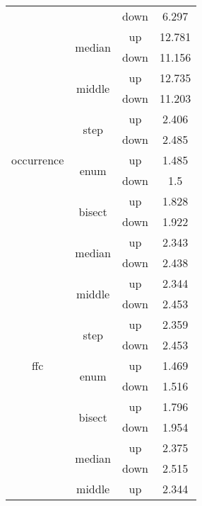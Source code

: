 \begin{table}[h!]
{\begin{tabular}{|c|c|c|c|}
                            &                         & down & 6.297 \\
                            & \multirow{2}{*}{median} & up & 12.781 \\ 
                            &                         & down & 11.156 \\
                            & \multirow{2}{*}{middle} & up & 12.735 \\ 
                            &                         & down & 11.203 \\
 \hline
\multirow{5}{*}{occurrence} & \multirow{2}{*}{step} & up & 2.406 \\ 
                            &                         & down & 2.485 \\
                            & \multirow{2}{*}{enum} & up & 1.485 \\ 
                            &                         & down & 1.5 \\
                            & \multirow{2}{*}{bisect} & up & 1.828 \\ 
                            &                         & down & 1.922 \\
                            & \multirow{2}{*}{median} & up & 2.343 \\ 
                            &                         & down & 2.438 \\
                            & \multirow{2}{*}{middle} & up & 2.344 \\ 
                            &                         & down & 2.453 \\
 \hline
\multirow{5}{*}{ffc} & \multirow{2}{*}{step} & up & 2.359 \\ 
                            &                         & down & 2.453 \\
                            & \multirow{2}{*}{enum} & up & 1.469 \\ 
                            &                         & down & 1.516 \\
                            & \multirow{2}{*}{bisect} & up & 1.796 \\ 
                            &                         & down & 1.954 \\
                            & \multirow{2}{*}{median} & up & 2.375 \\ 
                            &                         & down & 2.515 \\
                            & \multirow{2}{*}{middle} & up & 2.344 \\ 

\end{tabular}}
\end{table}

